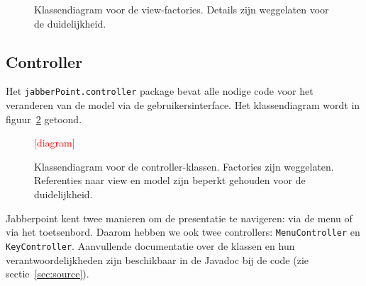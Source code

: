 \documentclass[a4paper]{article}
\newcommand{\todo}[1]{\textcolor{red}{[#1]}\\}
\newcommand{\code}[1]{\lstinline[columns=fixed]{#1}}
\begin{document}
			\begin{figure}[!htb]
			 \caption{
				Klassendiagram voor de view-factories.\label{diagram:view-factories}
				Details zijn weggelaten voor de duide\-lijk\-heid.
			 }
			\end{figure}

	\subsection{Controller}\label{sec:controller}
		Het \code{jabberPoint.controller} package bevat alle nodige code voor het veranderen van de model via de gebruikersinterface.
		Het klassendiagram wordt in figuur~\ref{diagram:controller} getoond.

		\begin{figure}[!htb]
		 \caption{
			Klassendiagram voor de controller-klassen.\label{diagram:controller}
			Factories zijn weggelaten.
			Referenties naar view en model zijn beperkt gehouden voor de duidelijkheid.
		 }
		 \todo{diagram} %
		\end{figure}

		Jabberpoint kent twee manieren om de presentatie te navigeren: via de menu of via het toetsenbord.
		Daarom hebben we ook twee controllers: \code{MenuController} en \code{KeyController}.
		Aanvullende documentatie over de klassen en hun verantwoordelijkheden zijn beschikbaar in de Javadoc bij de code (zie sectie~\ref{sec:source}).
\end{document}
